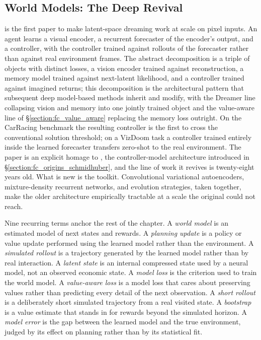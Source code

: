 \subsection{World Models: The Deep Revival}
\label{section:fc_ha_schmidhuber}

\citet{HaSchmidhuber2018} is the first paper to make latent-space dreaming work at scale on pixel inputs. An agent learns a visual encoder, a recurrent forecaster of the encoder's output, and a controller, with the controller trained against rollouts of the forecaster rather than against real environment frames. The abstract decomposition is a triple of objects with distinct losses, a vision encoder trained against reconstruction, a memory model trained against next-latent likelihood, and a controller trained against imagined returns; this decomposition is the architectural pattern that subsequent deep model-based methods inherit and modify, with the Dreamer line collapsing vision and memory into one jointly trained object and the value-aware line of \S\ref{section:fc_value_aware} replacing the memory loss outright. On the CarRacing benchmark the resulting controller is the first to cross the conventional solution threshold; on a VizDoom task a controller trained entirely inside the learned forecaster transfers zero-shot to the real environment. The paper is an explicit homage to \citet{Schmidhuber1990}, the controller-model architecture introduced in \S\ref{section:fc_origins_schmidhuber}, and the line of work it revives is twenty-eight years old. What is new is the toolkit. Convolutional variational autoencoders, mixture-density recurrent networks, and evolution strategies, taken together, make the older architecture empirically tractable at a scale the original could not reach.

Nine recurring terms anchor the rest of the chapter. A \emph{world model} is an estimated model of next states and rewards. A \emph{planning update} is a policy or value update performed using the learned model rather than the environment. A \emph{simulated rollout} is a trajectory generated by the learned model rather than by real interaction. A \emph{latent state} is an internal compressed state used by a neural model, not an observed economic state. A \emph{model loss} is the criterion used to train the world model. A \emph{value-aware loss} is a model loss that cares about preserving values rather than predicting every detail of the next observation. A \emph{short rollout} is a deliberately short simulated trajectory from a real visited state. A \emph{bootstrap} is a value estimate that stands in for rewards beyond the simulated horizon. A \emph{model error} is the gap between the learned model and the true environment, judged by its effect on planning rather than by its statistical fit.


